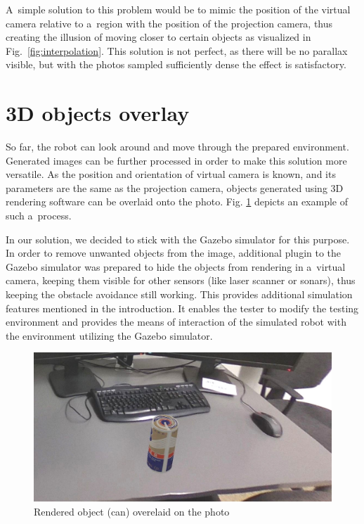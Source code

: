 \documentclass[conference]{ieeetran}
\begin{document}
A~simple solution to this problem would be to mimic the position of the virtual camera relative 
to a~region with the position of the projection camera, thus creating the illusion of moving closer 
to certain objects as visualized in Fig.~\ref{fig:interpolation}. This solution is not perfect,
as there will be no parallax visible, but with the photos sampled sufficiently dense the effect is satisfactory.

\section{3D objects overlay}
\label{sec:gazebo}

So far, the robot can look around and move through the prepared environment. 
Generated images can be further processed in order to make this solution more versatile.
As the position and orientation of virtual camera is known, and its parameters are the same
as the projection camera, objects generated using 3D rendering software can be overlaid onto the photo.
Fig. \ref{fig:join} depicts an example of such a~process.

In our solution, we decided to stick with the Gazebo simulator for this purpose.
In order to remove unwanted objects from the image, additional plugin to the Gazebo simulator
was prepared to hide the objects from rendering in a~virtual camera, keeping them 
visible for other sensors (like laser scanner or sonars), thus keeping the obstacle avoidance
still working. This provides additional simulation features mentioned in the introduction. 
It enables the tester to modify the testing environment and provides the means of interaction 
of the simulated robot with the environment utilizing the Gazebo simulator.

\begin{figure}[!ht]
    \centering
        \includegraphics[width=\columnwidth]{img/gazebo_integration/sumx.jpg}
    \caption{Rendered object (can) overelaid on the photo}
    \label{fig:join}
    \vspace{-5mm}
\end{figure}
\end{document}
